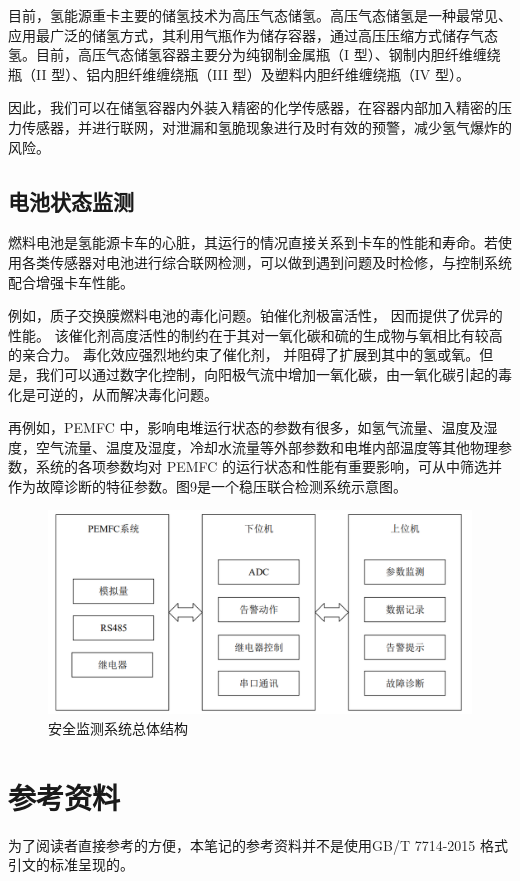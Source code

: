 \documentclass[UTF8,a4paper,11pt]{article}
\begin{document}
目前，氢能源重卡主要的储氢技术为高压气态储氢。高压气态储氢是一种最常见、应用最广泛的储氢方式，其利用气瓶作为储存容器，通过高压压缩方式储存气态氢。目前，高压气态储氢容器主要分为纯钢制金属瓶（I 型）、钢制内胆纤维缠绕瓶（II 型）、铝内胆纤维缠绕瓶（III 型）及塑料内胆纤维缠绕瓶（IV 型）。

因此，我们可以在储氢容器内外装入精密的化学传感器，在容器内部加入精密的压力传感器，并进行联网，对泄漏和氢脆现象进行及时有效的预警，减少氢气爆炸的风险。

\subsection{电池状态监测}

燃料电池是氢能源卡车的心脏，其运行的情况直接关系到卡车的性能和寿命。若使用各类传感器对电池进行综合联网检测，可以做到遇到问题及时检修，与控制系统配合增强卡车性能。

例如，质子交换膜燃料电池的毒化问题。铂催化剂极富活性， 因而提供了优异的性能。 该催化剂高度活性的制约在于其对一氧化碳和硫的生成物与氧相比有较高的亲合力。 毒化效应强烈地约束了催化剂， 并阻碍了扩展到其中的氢或氧。但是，我们可以通过数字化控制，向阳极气流中增加一氧化碳，由一氧化碳引起的毒化是可逆的，从而解决毒化问题。

再例如，PEMFC 中，影响电堆运行状态的参数有很多，如氢气流量、温度及湿度，空气流量、温度及湿度，冷却水流量等外部参数和电堆内部温度等其他物理参数，系统的各项参数均对 PEMFC 的运行状态和性能有重要影响，可从中筛选并作为故障诊断的特征参数。图9是一个稳压联合检测系统示意图。

\begin{figure}[htbp]
\centering
\includegraphics[scale=0.45]{p9.png}
\caption{安全监测系统总体结构}
\end{figure}



\section{参考资料}
为了阅读者直接参考的方便，本笔记的参考资料并不是使用GB/T 7714-2015 格式引文的标准呈现的。
\end{document}
